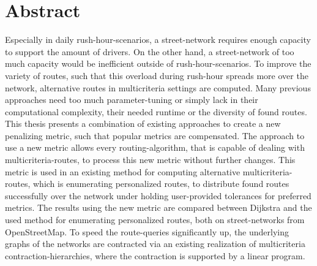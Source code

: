 \section*{Abstract}

Especially in daily rush-hour-scenarios, a street-network requires enough capacity to support the amount of drivers.
On the other hand, a street-network of too much capacity would be inefficient outside of rush-hour-scenarios.
To improve the variety of routes, such that this overload during rush-hour spreads more over the network, alternative routes in multicriteria settings are computed.
Many previous approaches need too much parameter-tuning or simply lack in their computational complexity, their needed runtime or the diversity of found routes.
This thesis presents a combination of existing approaches to create a new penalizing metric, such that popular metrics are compensated.
The approach to use a new metric allows every routing-algorithm, that is capable of dealing with multicriteria-routes, to process this new metric without further changes.
This metric is used in an existing method for computing alternative multicriteria-routes, which is enumerating personalized routes, to distribute found routes successfully over the network under holding user-provided tolerances for preferred metrics.
The results using the new metric are compared between Dijkstra and the used method for enumerating personalized routes, both on street-networks from OpenStreetMap.
To speed the route-queries significantly up, the underlying graphs of the networks are contracted via an existing realization of multicriteria contraction-hierarchies, where the contraction is supported by a linear program.